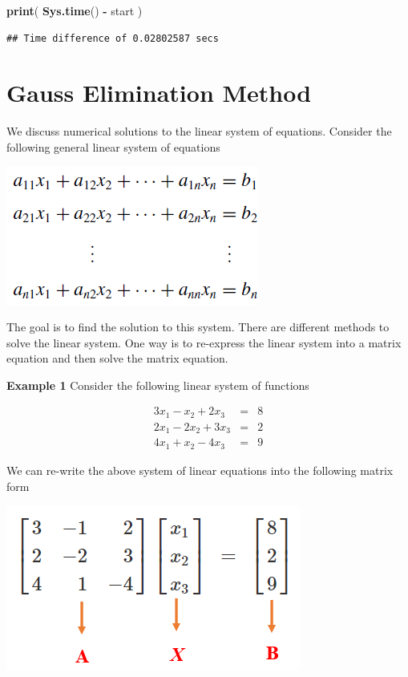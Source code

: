 \documentclass[
]{book}
\newenvironment{Shaded}{\begin{snugshade}}{\end{snugshade}}
\newcommand{\FunctionTok}[1]{\textcolor[rgb]{0.13,0.29,0.53}{\textbf{#1}}}
\newcommand{\NormalTok}[1]{#1}
\newcommand{\SpecialCharTok}[1]{\textcolor[rgb]{0.81,0.36,0.00}{\textbf{#1}}}
\begin{document}
\begin{Shaded}
\begin{Highlighting}[]
\FunctionTok{print}\NormalTok{( }\FunctionTok{Sys.time}\NormalTok{() }\SpecialCharTok{{-}}\NormalTok{ start )}
\end{Highlighting}
\end{Shaded}

\begin{verbatim}
## Time difference of 0.02802587 secs
\end{verbatim}

\hypertarget{gauss-elimination-method}{%
\chapter{Gauss Elimination Method}\label{gauss-elimination-method}}

We discuss numerical solutions to the linear system of equations. Consider the following general linear system of equations

\begin{center}\includegraphics[width=0.35\linewidth]{img07/w07-LinearSysEq} \end{center}

The goal is to find the solution to this system. There are different methods to solve the linear system. One way is to re-express the linear system into a matrix equation and then solve the matrix equation.

\textbf{Example 1} Consider the following linear system of functions

\[
\begin{array}{ccc}
3x_1 - x_2 + 2x_3 & = & 8  \\ 
2x_1 - 2x_2 + 3x_3 & = & 2 \\ 
4x_1 + x_2 - 4x_3 & = & 9 
\end{array}
\]

We can re-write the above system of linear equations into the following matrix form

\begin{center}\includegraphics[width=0.45\linewidth]{img07/w07-Example01MatrixForm} \end{center}
\end{document}
